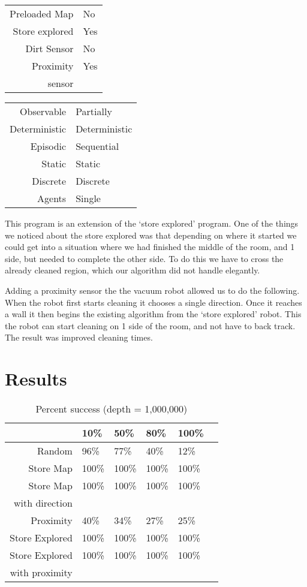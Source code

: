 \documentclass[letterpaper]{article}
\begin{document}
\begin{tabular}{ r | l }  
	Preloaded Map 		& No \\
	Store explored 		& Yes \\
	Dirt Sensor 		& No \\
	Proximity 		 	& Yes \\
	sensor 					 \\
\end{tabular}
\quad
\begin{tabular}{ r | l }  
	Observable		& Partially 	\\
	Deterministic	& Deterministic	\\
	Episodic		& Sequential	\\
	Static		 	& Static 		\\
	Discrete 		& Discrete 		\\
	Agents		 	& Single 		\\	
\end{tabular}
This program is an extension of the `store explored' program.  One of the things we noticed about the store explored was that depending on where it started we could get into a situation where we had finished the middle of the room, and 1 side, but needed to complete the other side.  To do this we have to cross the already cleaned region, which our algorithm did not handle elegantly.

Adding a proximity sensor the the vacuum robot allowed us to do the following.  When the robot first starts cleaning it chooses a single direction.  Once it reaches a wall it then begins the existing algorithm from the `store explored' robot.  This the robot can start cleaning on 1 side of the room, and not have to back track.  The result was improved cleaning times.

\section{Results}
\begin{table}[h!]
\begin{tabular}{ r | l l l l l }  
					& 10\%		& 50\%		& 80\%		& 100\%		\\
	\midrule
	Random			& 96\% 		& 77\% 		& 40\%		& 12\%		\\
	Store Map		& 100\%		& 100\% 	& 100\%  	& 100\% 	\\
	Store Map 		& 100\%		& 100\% 	& 100\%  	& 100\% 	\\
	with direction \\
	Proximity		& 40\%		& 34\% 		& 27\%  	& 25\% 		\\
	Store Explored 	& 100\%		& 100\% 	& 100\%  	& 100\% 	\\
	Store Explored 	& 100\%		& 100\% 	& 100\%  	& 100\% 	\\
	with proximity 	\\
\end{tabular}
\caption{Percent success (depth = 1,000,000)}
\label{table:1}
\end{table}
\end{document}
